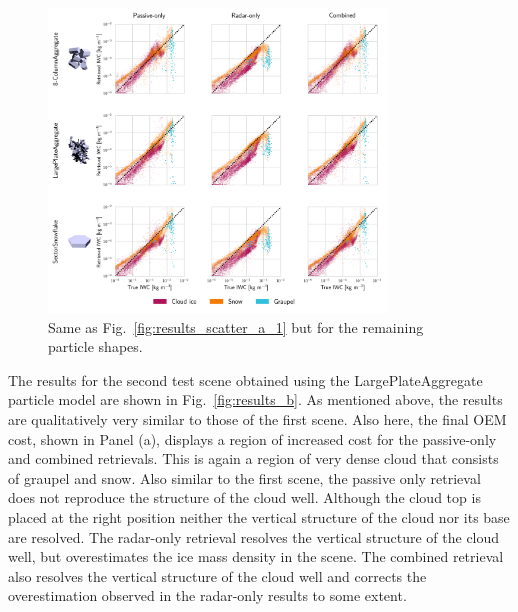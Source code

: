 \documentclass[journal abbreviation, manuscript]{copernicus}
\begin{document}
\begin{figure}
\centering
\includegraphics[width = 0.8\textwidth]{../plots/results_scatter_a_2}
\caption{Same as Fig.~\ref{fig:results_scatter_a_1} but for the remaining particle
  shapes.}
\label{fig:results_scatter_a_2}
\end{figure}


The results for the second test scene obtained using the LargePlateAggregate
particle model are shown in Fig.~\ref{fig:results_b}. As mentioned above, the
results are qualitatively very similar to those of the first scene. Also here,
the final OEM cost, shown in Panel (a), displays a region of increased cost for
the passive-only and combined retrievals. This is again a region of very dense
cloud that consists of graupel and snow. Also similar to the first scene, the
passive only retrieval does not reproduce the structure of the cloud well.
Although the cloud top is placed at the right position neither the vertical
structure of the cloud nor its base are resolved. The radar-only retrieval
resolves the vertical structure of the cloud well, but overestimates the ice
mass density in the scene. The combined retrieval also resolves the vertical
structure of the cloud well and corrects the overestimation observed in the
radar-only results to some extent.
\end{document}
